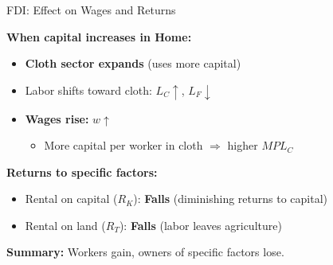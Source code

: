 
\begin{frame}{FDI: Effect on Wages and Returns}

\textbf{When capital increases in Home:}

\vspace{0.3cm}

\begin{itemize}
    \item \textbf{Cloth sector expands} (uses more capital)
    
    \vspace{0.2cm}
    
    \item Labor shifts toward cloth: $L_C \uparrow$, $L_F \downarrow$
    
    \vspace{0.2cm}
    
    \item \textbf{Wages rise:} $w \uparrow$
    \begin{itemize}
        \item More capital per worker in cloth $\Rightarrow$ higher $MPL_C$
    \end{itemize}
\end{itemize}

\vspace{0.3cm}

\textbf{Returns to specific factors:}
\begin{itemize}
    \item \textcolor{capitalcolor}{Rental on capital ($R_K$):} \textbf{Falls} (diminishing returns to capital)
    \item \textcolor{landcolor}{Rental on land ($R_T$):} \textbf{Falls} (labor leaves agriculture)
\end{itemize}

\vspace{0.3cm}

\textbf{Summary:} Workers gain, owners of specific factors lose.

\end{frame}


